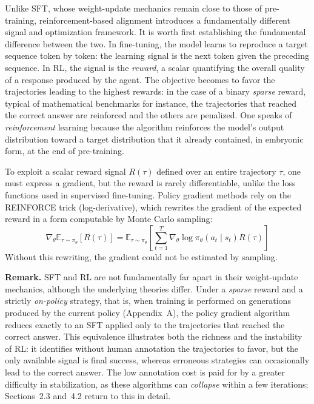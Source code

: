 \documentclass[11pt,a4paper]{article}
\begin{document}
Unlike SFT, whose weight-update mechanics remain close to those of pre-training, reinforcement-based alignment introduces a fundamentally different signal and optimization framework. It is worth first establishing the fundamental difference between the two. In fine-tuning, the model learns to reproduce a target sequence token by token: the learning signal is the next token given the preceding sequence. In RL, the signal is the \emph{reward}, a scalar quantifying the overall quality of a response produced by the agent. The objective becomes to favor the trajectories leading to the highest rewards: in the case of a binary \emph{sparse} reward, typical of mathematical benchmarks for instance, the trajectories that reached the correct answer are reinforced and the others are penalized. One speaks of \emph{reinforcement} learning because the algorithm reinforces the model's output distribution toward a target distribution that it already contained, in embryonic form, at the end of pre-training.

To exploit a scalar reward signal $R(\tau)$ defined over an entire trajectory $\tau$, one must express a gradient, but the reward is rarely differentiable, unlike the loss functions used in supervised fine-tuning. Policy gradient methods rely on the REINFORCE trick (log-derivative), which rewrites the gradient of the expected reward in a form computable by Monte Carlo sampling:
\begin{equation}
\nabla_\theta \mathbb{E}_{\tau \sim \pi_\theta}[R(\tau)] = \mathbb{E}_{\tau \sim \pi_\theta} \left[ \sum_{t=1}^T \nabla_\theta \log \pi_\theta(a_t \mid s_t) R(\tau) \right]
\end{equation}
Without this rewriting, the gradient could not be estimated by sampling.

\textbf{Remark.} SFT and RL are not fundamentally far apart in their weight-update mechanics, although the underlying theories differ. Under a \emph{sparse} reward and a strictly \emph{on-policy} strategy, that is, when training is performed on generations produced by the current policy (Appendix~A), the policy gradient algorithm reduces exactly to an SFT applied only to the trajectories that reached the correct answer. This equivalence illustrates both the richness and the instability of RL: it identifies without human annotation the trajectories to favor, but the only available signal is final success, whereas erroneous strategies can occasionally lead to the correct answer. The low annotation cost is paid for by a greater difficulty in stabilization, as these algorithms can \emph{collapse} within a few iterations; Sections~2.3 and~4.2 return to this in detail.
\end{document}
